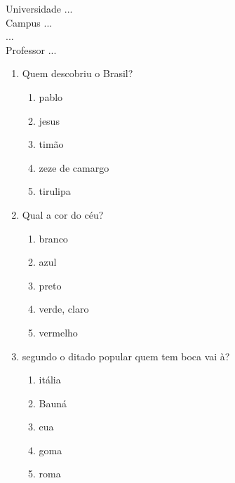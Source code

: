 \documentclass[10pt,a4paper,twocolumn]{report}
\begin{document}
\begin{flushleft}
Universidade ...\\
Campus ...\\
...\\
Professor ...\\
\end{flushleft}




 \begin{enumerate} 
    \item  Quem descobriu o Brasil?





    \begin{enumerate}
    \item  pablo

\item  jesus

\item  timão

\item  zeze de camargo

\item  tirulipa


    \end{enumerate} 
    \item  Qual a cor do céu?





    \begin{enumerate}
    \item  branco

\item  azul

\item  preto

\item  verde, claro

\item  vermelho


    \end{enumerate} 
    \item  segundo o ditado popular quem tem boca vai à?





    \begin{enumerate}
    \item  itália

\item  Bauná

\item  eua

\item  goma

\item  roma


    \end{enumerate}\end{enumerate} 
\end{document}
